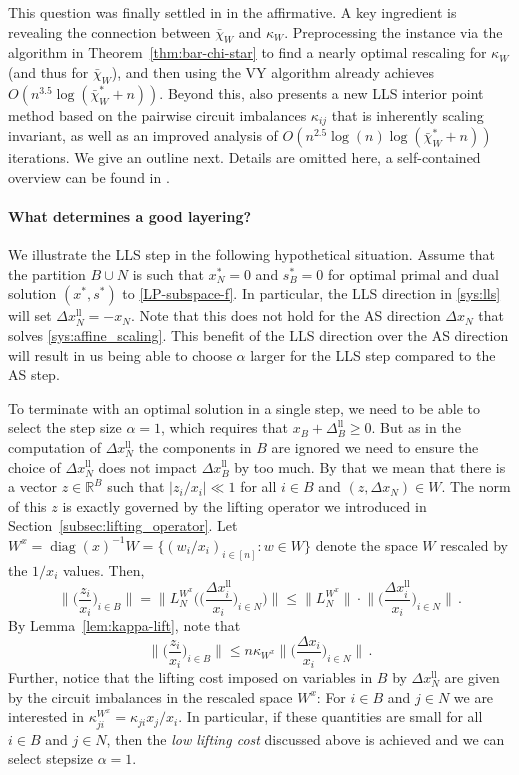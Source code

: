 \documentclass[11pt, a4paper]{article}
\newcommand{\Le}{\kappa}
\newcommand{\1}{\mathbbm{1}}
\newcommand{\lal}{\mathrm{ll}}
\theoremstyle{case}
\newcommand{\R}{\mathbb{R}}
\begin{document}
This question was finally settled in \cite{DHNV20} in the affirmative. A key ingredient is revealing the connection between $\bar\chi_W$ and $\Le_W$. Preprocessing the instance via  the algorithm in Theorem~\ref{thm:bar-chi-star} to find a nearly optimal rescaling for $\Le_W$ (and thus for $\bar\chi_W$), and then using the VY algorithm already achieves $O(n^{3.5}\log(\bar \chi^*_W + n))$.
Beyond this, \cite{DHNV20} also presents a new LLS interior point method based on the pairwise circuit imbalances $\Le_{ij}$ that is inherently scaling invariant, as well as an improved analysis of $O(n^{2.5}\log(n)\log(\bar \chi^*_W + n))$ iterations.
 We give an outline next. Details are omitted here, a self-contained 
 overview  can be found in \cite{DHNV20}.

\paragraph{What determines a good layering?}
We illustrate the LLS step in the following hypothetical situation. Assume that the partition $B \cup N$ is such that $x_N^* = 0$ and $s_B^*=0$ for  optimal primal and dual solution $(x^*,s^*)$ to \ref{LP-subspace-f}. 
In particular, the LLS direction in \eqref{sys:lls} will set $\Delta x_N^\lal = -x_N$. Note that this does not hold for the AS direction $\Delta x_N$ that solves \eqref{sys:affine_scaling}. This benefit of the LLS direction over the AS direction will result in us being able to choose $\alpha$ larger for the LLS step compared to the AS step. 

To terminate with an optimal solution in a single step, we need to be able to select the step size $\alpha=1$, which requires that $x_B+\Delta_B^\lal\ge 0$.
But as in the computation of $\Delta x_N^\lal$ the components in $B$ are ignored we need to ensure the choice of $\Delta x_N^\lal$ does not impact $\Delta x_B^\lal$ by too much. By that we mean that there is a vector $z \in \R^B$ such that $|z_i/x_i| \ll 1$ for all $i \in B$ and $(z, \Delta x_N) \in W$. The norm of this $z$ is exactly governed by the lifting operator we introduced in Section~\ref{subsec:lifting_operator}. Let $W^x=\operatorname{diag}(x)^{-1}W= \{(w_i/x_i)_{i \in [n]} : w \in W\}$ denote the space $W$ rescaled by the $1/x_i$ values. Then,
\begin{equation}
\Big\|\Big(\frac{z_i}{x_i}\Big)_{i \in B}\Big\| = \Big\|L_N^{W^x}\Big(\Big(\frac{\Delta x_i^\lal}{x_i}\Big)_{i \in N}\Big)\Big\| \le \|L_N^{W^x}\| \cdot \Big\|\Big(\frac{\Delta x_i^\lal}{x_i}\Big)_{i \in N}\Big\|\, .
\end{equation}
By Lemma~\ref{lem:kappa-lift}, note that
\begin{equation}
  \Big\|\Big(\frac{z_i}{x_i}\Big)_{i \in B}\Big\| \le n\kappa_{W^x} \Big\|\Big(\frac{\Delta x_i}{x_i}\Big)_{i \in N}\Big\|\, .
\end{equation}
Further, notice that the lifting cost imposed on variables in $B$ by $\Delta x_N^\lal$ are given by the circuit imbalances in the rescaled space $W^x$: For $i \in B$ and $j \in N$ we are interested in $\kappa^{W^x}_{ji} = \kappa_{ji}{x_j}/{x_i}$.
In particular, if these quantities are small for all $i\in B$ and $j\in N$, then the \emph{low lifting cost} discussed above is achieved and we can select stepsize $\alpha=1$.
\end{document}
